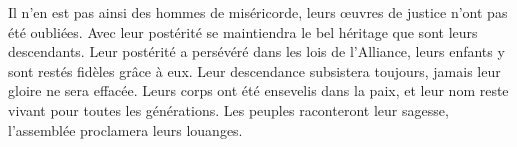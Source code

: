 Il n’en est pas ainsi des hommes de miséricorde,
	leurs œuvres de justice n’ont pas été oubliées.
Avec leur postérité se maintiendra le bel héritage que sont leurs descendants.
Leur postérité a persévéré dans les lois de l’Alliance,
	leurs enfants y sont restés fidèles grâce à eux.
Leur descendance subsistera toujours, jamais leur gloire ne sera effacée.
Leurs corps ont été ensevelis dans la paix,
	et leur nom reste vivant pour toutes les générations.
Les peuples raconteront leur sagesse, l’assemblée proclamera leurs louanges.
